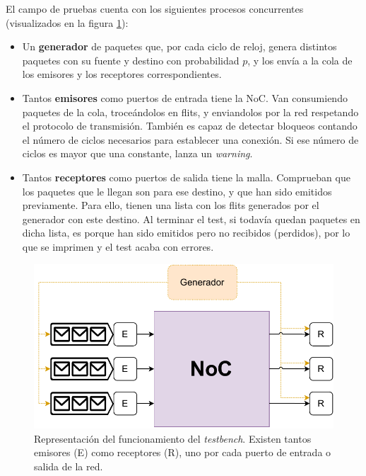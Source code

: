 El campo de pruebas cuenta con los siguientes procesos concurrentes (visualizados en la figura \ref{fig:diagram_testbench}):
\begin{itemize}[nosep]
    \item Un \textbf{generador} de paquetes que, por cada ciclo de reloj, genera distintos paquetes con su fuente y destino con probabilidad $p$, y los envía a la cola de los emisores y los receptores correspondientes.
    \item Tantos \textbf{emisores} como puertos de entrada tiene la NoC. Van consumiendo paquetes de la cola, troceándolos en flits, y enviandolos por la red respetando el protocolo de transmisión. También es capaz de detectar bloqueos contando el número de ciclos necesarios para establecer una conexión. Si ese número de ciclos es mayor que una constante, lanza un \textit{warning}.
    \item Tantos \textbf{receptores} como puertos de salida tiene la malla. Comprueban que los paquetes que le llegan son para ese destino, y que han sido emitidos previamente. Para ello, tienen una lista con los flits generados por el generador con este destino. Al terminar el test, si todavía quedan paquetes en dicha lista, es porque han sido emitidos pero no recibidos (perdidos), por lo que se imprimen y el test acaba con errores.
\end{itemize}

\begin{figure}[h]
    \centering
    \includegraphics{images/diagrams/testbench.drawio.pdf}
    \caption[Diagrama del funcionamiento del \textit{testbench}.]{Representación del funcionamiento del \textit{testbench}. Existen tantos emisores (E) como receptores (R), uno por cada puerto de entrada o salida de la red.}
    \label{fig:diagram_testbench}
\end{figure}

